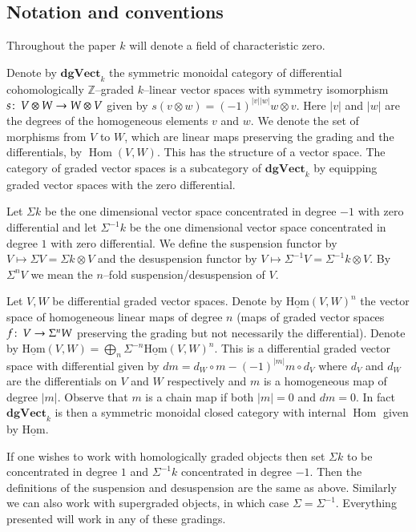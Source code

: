 \documentclass[british]{amsart}
\theoremstyle{plain}
\theoremstyle{definition}
{
\newaliascnt{{definition}}{theorem}\newtheorem{{definition}}[{definition}]{{Definition}}\aliascntresetthe{{definition}}\expandafterautorefname\endcsname{{Definition}}}
{
\newaliascnt{{remark}}{theorem}\newtheorem{{remark}}[{remark}]{{Remark}}\aliascntresetthe{{remark}}\expandafterautorefname\endcsname{{Remark}}}
{
\newaliascnt{{example}}{theorem}\newtheorem{{example}}[{example}]{{Example}}\aliascntresetthe{{example}}\expandafterautorefname\endcsname{{Example}}}
{
\newaliascnt{{examples}}{theorem}\newtheorem{{examples}}[{examples}]{{Examples}}\aliascntresetthe{{examples}}\expandafterautorefname\endcsname{{Examples}}}
{
\newaliascnt{{notation}}{theorem}\newtheorem{{notation}}[{notation}]{{Notation}}\aliascntresetthe{{notation}}\expandafterautorefname\endcsname{{Notation}}}
{
\newaliascnt{{convention}}{theorem}\newtheorem{{convention}}[{convention}]{{Convention}}\aliascntresetthe{{convention}}\expandafterautorefname\endcsname{{Convention}}}
\numberwithin{equation}{section}
\numberwithin{figure}{section}
\begin{document}
\subsection{Notation and conventions}
Throughout the paper $k$ will denote a field of characteristic zero.

Denote by ${\mathbf{dgVect}_k}$ the symmetric monoidal category of differential cohomologically $\mathbb{Z}$--graded $k$--linear vector spaces with symmetry isomorphism $s{\colon\thinspace} V\otimes W \rightarrow W\otimes V$ given by $s(v\otimes w) = (-1)^{{\lvert {v} \rvert}{\lvert {w} \rvert}} w \otimes v$. Here ${\lvert {v} \rvert}$ and ${\lvert {w} \rvert}$ are the degrees of the homogeneous elements $v$ and $w$. We denote the set of morphisms from $V$ to $W$, which are linear maps preserving the grading and the differentials, by $\operatorname{Hom}(V,W)$. This has the structure of a vector space. The category of graded vector spaces is a subcategory of ${\mathbf{dgVect}_k}$ by equipping graded vector spaces with the zero differential.

Let $\Sigma k$ be the one dimensional vector space concentrated in degree $-1$ with zero differential and let $\Sigma^{-1} k$ be the one dimensional vector space concentrated in degree $1$ with zero differential. We define the suspension functor by $V \mapsto \Sigma V = \Sigma k \otimes V$ and the desuspension functor by $V \mapsto \Sigma^{-1} V = \Sigma^{-1} k \otimes V$. By $\Sigma^n V$ we mean the $n$--fold suspension/desuspension of $V$.

Let $V,W$ be differential graded vector spaces. Denote by $\operatorname{\underline{Hom}}(V,W)^n$ the vector space of homogeneous linear maps of degree $n$ (maps of graded vector spaces $f{\colon\thinspace} V\rightarrow \Sigma^n W$ preserving the grading but not necessarily the differential). Denote by $\operatorname{\underline{Hom}}(V,W)=\bigoplus_n\Sigma^{-n}\operatorname{\underline{Hom}}(V,W)^n$. This is a differential graded vector space with differential given by $dm = d_W\circ m - (-1)^{{\lvert {m} \rvert}}m\circ d_V$ where $d_V$ and $d_W$ are the differentials on $V$ and $W$ respectively and $m$ is a homogeneous map of degree ${\lvert {m} \rvert}$. Observe that $m$ is a chain map if both ${\lvert {m} \rvert}=0$ and $dm=0$. In fact ${\mathbf{dgVect}_k}$ is then a symmetric monoidal closed category with internal $\operatorname{Hom}$ given by $\operatorname{\underline{Hom}}$.

If one wishes to work with homologically graded objects then set $\Sigma k$ to be concentrated in degree $1$ and $\Sigma^{-1} k$ concentrated in degree $-1$. Then the definitions of the suspension and desuspension are the same as above. Similarly we can also work with supergraded objects, in which case $\Sigma=\Sigma^{-1}$. Everything presented will work in any of these gradings.
\end{document}
